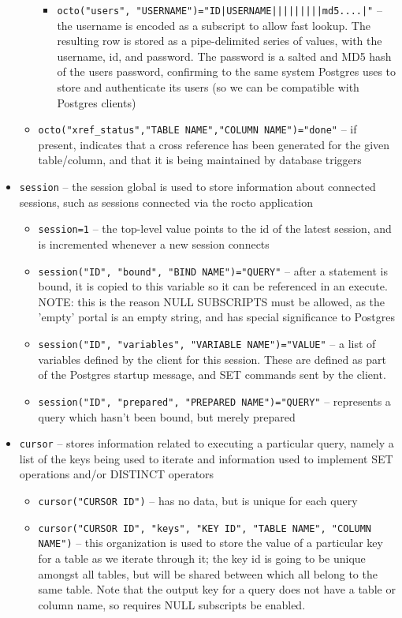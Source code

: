 \documentclass[]{article}
\def\code#1{\texttt{#1}}
\begin{document}
\begin{itemize}
\begin{itemize}
\begin{itemize}
			\item \code{octo("users", "USERNAME")="ID|USERNAME|||||||||md5....|"} -- the username is encoded as a subscript to allow fast lookup. The resulting row is stored as a pipe-delimited series of values, with the username, id, and password. The password is a salted and MD5 hash of the users password, confirming to the same system Postgres uses to store and authenticate its users (so we can be compatible with Postgres clients)
		\end{itemize}
		\item \code{octo("xref\_status","TABLE NAME","COLUMN NAME")="done"} -- if present, indicates that a cross reference has been generated for the given table/column, and that it is being maintained by database triggers
	\end{itemize}
	\item \code{session} -- the session global is used to store information about connected sessions, such as sessions connected via the rocto application
	\begin{itemize}
		\item \code{session=1} -- the top-level value points to the id of the latest session, and is incremented whenever a new session connects
		\item \code{session("ID", "bound", "BIND NAME")="QUERY"} -- after a statement is bound, it is copied to this variable so it can be referenced in an execute. NOTE: this is the reason NULL SUBSCRIPTS must be allowed, as the 'empty' portal is an empty string, and has special significance to Postgres
		\item \code{session("ID", "variables", "VARIABLE NAME")="VALUE"} -- a list of variables defined by the client for this session. These are defined as part of the Postgres startup message, and SET commands sent by the client.
		\item \code{session("ID", "prepared", "PREPARED NAME")="QUERY"} -- represents a query which hasn't been bound, but merely prepared
	\end{itemize}
	\item \code{cursor} -- stores information related to executing a particular query, namely a list of the keys being used to iterate and information used to implement SET operations and/or DISTINCT operators
	\begin{itemize}
		\item \code{cursor("CURSOR ID")} -- has no data, but is unique for each query
		\item \code{cursor("CURSOR ID", "keys", "KEY ID", "TABLE NAME", "COLUMN NAME")} -- this organization is used to store the value of a particular key for a table as we iterate through it; the key id is going to be unique amongst all tables, but will be shared between which all belong to the same table. Note that the output key for a query does not have a table or column name, so requires NULL subscripts be enabled.

\end{itemize}
\end{itemize}
\end{document}
